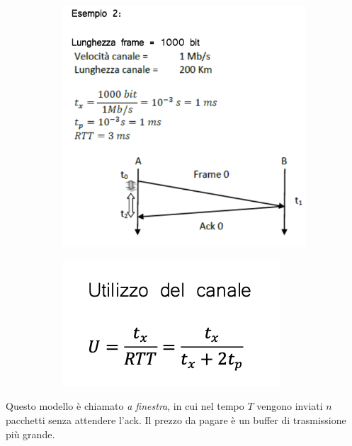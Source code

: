 \documentclass[11pt, oneside]{article}   	%
\begin{document}
\begin{figure}[H]
\begin{subfigure}[h]{0.4\linewidth}
\includegraphics[width=\linewidth]{ex1}
\end{subfigure}
\hfill
\begin{subfigure}[h]{0.4\linewidth}
\includegraphics[width=\linewidth]{ex2}
\end{subfigure}%
\end{figure}
Questo modello è chiamato \emph{a finestra}, in cui nel tempo $T$ vengono inviati $n$ pacchetti senza attendere l'ack. Il prezzo da pagare è un buffer di trasmissione più grande.
\end{document}
